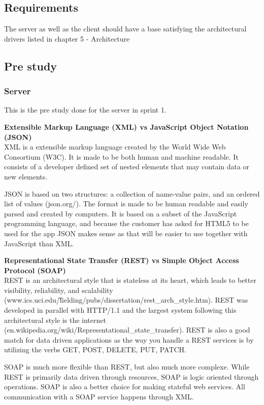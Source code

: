 \documentclass[11pt]{book}
\begin{document}
\subsection{Requirements}
The server as well as the client should have a base satisfying the architectural drivers listed in chapter 5 - Architecture

\subsection{Pre study}

\subsubsection{Server}
This is the pre study done for the server in sprint 1.

\textbf{Extensible Markup Language (XML) vs JavaScript Object Notation (JSON)}\\
XML is a extensible markup language created by the World Wide Web Consortium (W3C). It is made to be both human and machine readable. It consists of a developer defined set of nested elements that may contain data or new elements.

JSON is based on two structures: a collection of name-value pairs, and an ordered list of values (json.org/). The format is made to be human readable and easily parsed and created by computers. It is based on a subset of the JavaScript programming language, and because the customer has asked for HTML5 to be used for the app JSON makes sense as that will be easier to use together with JavaScript than XML.

\textbf{Representational State Transfer (REST) vs Simple Object Access Protocol (SOAP)}\\
REST is an architectural style that is stateless at its heart, which leads to better visibility, reliability, and scalability (www.ics.uci.edu/\~fielding/pubs/dissertation/rest\_arch\_style.htm). REST was developed in parallel with HTTP/1.1 and the largest system following this architectural style is the internet (en.wikipedia.org/wiki/Representational\_state\_transfer). REST is also a good match for data driven applications as the way you handle a REST services is by utilizing the verbs GET, POST, DELETE, PUT, PATCH.

SOAP is much more flexible than REST, but also much more complexe. While REST is primarily data driven through resources, SOAP is logic oriented through operations. SOAP is also a better choice for making stateful web services. All communication with a SOAP service happens through XML.
\end{document}
